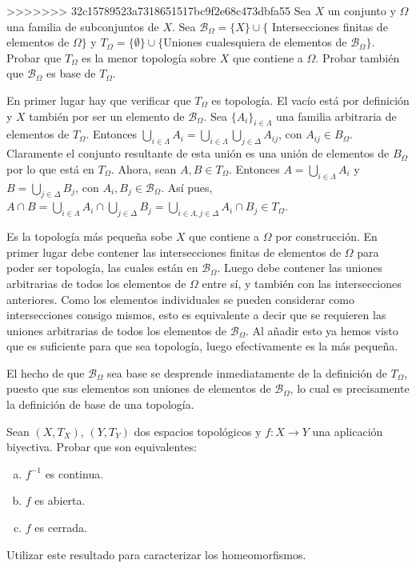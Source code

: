 \documentclass{article}
\begin{document}
\begin{ejer}
>>>>>>> 32c15789523a7318651517bc9f2e68c473dbfa55
Sea $X$ un conjunto y $\Omega$ una familia de subconjuntos de $X$. Sea $\mathcal{B}_\Omega=\{X\}\cup\{$ Intersecciones finitas de elementos de $\Omega\}$ y $T_\Omega=\{\emptyset\}\cup\{$Uniones cualesquiera de elementos de $\mathcal{B}_\Omega\}$. Probar que $T_\Omega$ es la menor topología sobre $X$ que contiene a $\Omega$. Probar también que $\mathcal{B}_\Omega$ es base de $T_\Omega$.
\end{ejer}

\begin{sol}
En primer lugar hay que verificar que $T_\Omega$ es topología. El vacío está por definición y $X$ también por ser un elemento de $\mathcal{B}_\Omega$. Sea $\{A_i\}_{i\in\Lambda}$ una familia arbitraria de elementos de $T_\Omega$. Entonces $\bigcup_{i\in\Lambda}A_i=\bigcup_{i\in\Lambda}\bigcup_{j\in\Delta} A_{ij}$, con $A_{ij}\in B_\Omega$. Claramente el conjunto resultante de esta unión es una unión de elementos de $B_\Omega$ por lo que está en $T_\Omega$. Ahora, sean $A,B\in T_\Omega$. Entonces $A=\bigcup_{i\in\Lambda} A_i$ y $B=\bigcup_{j\in\Delta} B_j$, con $A_i,B_j\in\mathcal{B}_\Omega$. Así pues, $A\cap B=\bigcup_{i\in\Lambda} A_i\cap \bigcup_{j\in\Delta} B_j = \bigcup_{i\in\Lambda,j\in\Delta} A_i \cap B_j\in T_\Omega$.

Es la topología más pequeña sobe $X$ que contiene a $\Omega$ por construcción. En primer lugar debe contener las intersecciones finitas de elementos de $\Omega$ para poder ser topología, las cuales están en $\mathcal{B}_\Omega$. Luego debe contener las uniones arbitrarias de todos los elementos de $\Omega$ entre sí, y también con las intersecciones anteriores. Como los elementos individuales se pueden considerar como intersecciones consigo mismos, esto es equivalente a decir que se requieren las uniones arbitrarias de todos los elementos de $\mathcal{B}_\Omega$. Al añadir esto ya hemos visto que es suficiente para que sea topología, luego efectivamente es la más pequeña.

El hecho de que $\mathcal{B}_\Omega$ sea base se desprende inmediatamente de la definición de $T_\Omega$, puesto que sus elementos son uniones de elementos de $\mathcal{B}_\Omega$, lo cual es precisamente la definición de base de una topología.
\end{sol}


\newpage
\begin{ejer}
Sean $(X,T_X)$, $(Y,T_Y)$ dos espacios topológicos y $f:X\rightarrow Y$ una aplicación biyectiva. Probar que son equivalentes:
\begin{enumerate}[(a)]
\item $f^{-1}$ es continua.
\item $f$ es abierta.
\item $f$ es cerrada.
\end{enumerate}
Utilizar este resultado para caracterizar los homeomorfismos.
\end{ejer}
\end{document}

